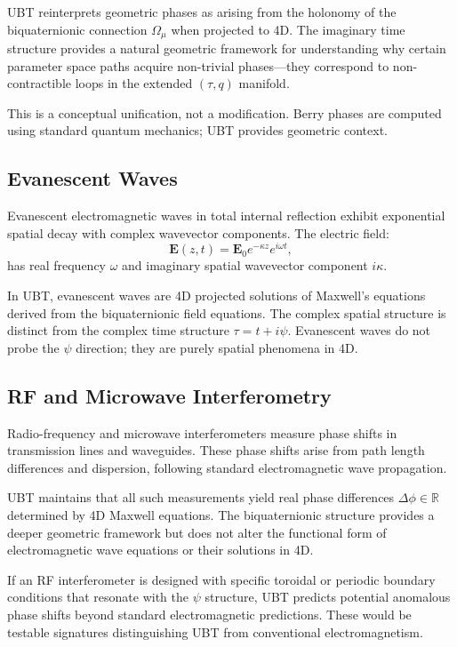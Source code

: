 \documentclass[12pt]{article}
\begin{document}
UBT reinterprets geometric phases as arising from the holonomy of the biquaternionic connection $\Omega_\mu$ when projected to 4D. The imaginary time structure provides a natural geometric framework for understanding why certain parameter space paths acquire non-trivial phases—they correspond to non-contractible loops in the extended $(\tau, q)$ manifold.

This is a conceptual unification, not a modification. Berry phases are computed using standard quantum mechanics; UBT provides geometric context.

\subsection{Evanescent Waves}

Evanescent electromagnetic waves in total internal reflection exhibit exponential spatial decay with complex wavevector components. The electric field:
\begin{equation}
\mathbf{E}(z, t) = \mathbf{E}_0 e^{-\kappa z} e^{i\omega t},
\end{equation}
has real frequency $\omega$ and imaginary spatial wavevector component $i\kappa$.

In UBT, evanescent waves are 4D projected solutions of Maxwell's equations derived from the biquaternionic field equations. The complex spatial structure is distinct from the complex time structure $\tau = t + i\psi$. Evanescent waves do not probe the $\psi$ direction; they are purely spatial phenomena in 4D.

\subsection{RF and Microwave Interferometry}

Radio-frequency and microwave interferometers measure phase shifts in transmission lines and waveguides. These phase shifts arise from path length differences and dispersion, following standard electromagnetic wave propagation.

UBT maintains that all such measurements yield real phase differences $\Delta\phi \in \mathbb{R}$ determined by 4D Maxwell equations. The biquaternionic structure provides a deeper geometric framework but does not alter the functional form of electromagnetic wave equations or their solutions in 4D.

If an RF interferometer is designed with specific toroidal or periodic boundary conditions that resonate with the $\psi$ structure, UBT predicts potential anomalous phase shifts beyond standard electromagnetic predictions. These would be testable signatures distinguishing UBT from conventional electromagnetism.
\end{document}

